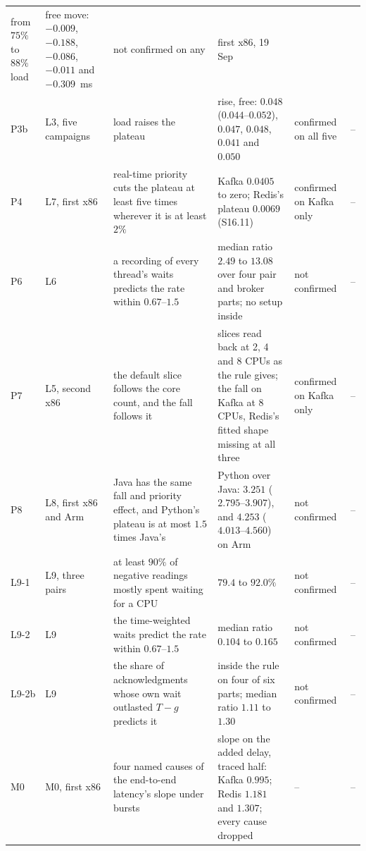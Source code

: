 \documentclass[10pt,journal,onecolumn]{IEEEtran}
\newcommand{\kafka}{Kafka}
\newcommand{\redis}{Redis}
\begin{document}
\begin{table}[htbp]
\begin{tabular}{@{}p{0.9cm}p{1.7cm}p{4.0cm}p{6.0cm}p{1.6cm}p{1.5cm}@{}}
from $75\%$ to $88\%$ load & \raggedright free move: $-0.009$, $-0.188$, $-0.086$, $-0.011$ and
$-0.309$~ms & \raggedright not confirmed on any & \raggedright first x86, 19
Sep\tabularnewline
P3b & \raggedright L3, five campaigns & \raggedright load raises the plateau & \raggedright rise,
free: $0.048$ ($0.044$--$0.052$), $0.047$, $0.048$, $0.041$ and $0.050$ & \raggedright confirmed
on all five & --\\
P4 & \raggedright L7, first x86 & \raggedright real-time priority cuts the plateau at least five
times wherever it is at least $2\%$ & \raggedright \kafka{} $0.0405$ to zero; \redis{}'s plateau
$0.0069$ (S16.11) & \raggedright confirmed on \kafka{} only & --\\
P6 & \raggedright L6 & \raggedright a recording of every thread's waits predicts the rate within
$0.67$--$1.5$ & \raggedright median ratio $2.49$ to $13.08$ over four pair and broker parts; no
setup inside & \raggedright not confirmed & --\\
P7 & \raggedright L5, second x86 & \raggedright the default slice follows the core count, and the
fall follows it & \raggedright slices read back at 2, 4 and 8 CPUs as the rule gives; the fall on
\kafka{} at 8 CPUs, \redis{}'s fitted shape missing at all three & \raggedright confirmed on
\kafka{} only & --\\
P8 & \raggedright L8, first x86 and Arm & \raggedright Java has the same fall and priority effect,
and Python's plateau is at most $1.5$ times Java's & \raggedright Python over Java: $3.251$
($2.795$--$3.907$), and $4.253$ ($4.013$--$4.560$) on Arm & \raggedright not confirmed & --\\
L9-1 & \raggedright L9, three pairs & \raggedright at least $90\%$ of negative readings mostly
spent waiting for a CPU & \raggedright $79.4$ to $92.0\%$ & \raggedright not confirmed & --\\
L9-2 & \raggedright L9 & \raggedright the time-weighted waits predict the rate within
$0.67$--$1.5$ & \raggedright median ratio $0.104$ to $0.165$ & \raggedright not confirmed & --\\
L9-2b & \raggedright L9 & \raggedright the share of acknowledgments whose own wait outlasted
$T - g$ predicts it & \raggedright inside the rule on four of six parts; median ratio $1.11$ to
$1.30$ & \raggedright not confirmed & --\\
M0 & \raggedright M0, first x86 & \raggedright four named causes of the end-to-end latency's slope
under bursts & \raggedright slope on the added delay, traced half: \kafka{} $0.995$; \redis{} $1.181$ and $1.307$;
every cause dropped & -- & --\\
\bottomrule
\end{tabular}
\end{table}
\end{document}
